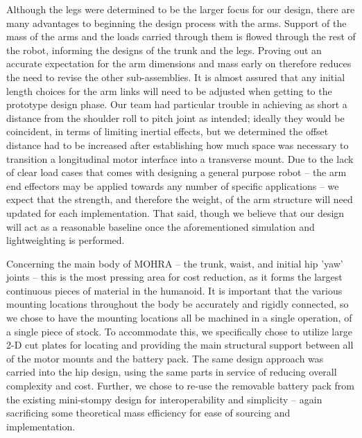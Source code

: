 \documentclass{article}
\begin{document}
Although the legs were determined to be the larger focus for our design, there are many advantages to beginning the design process with the arms. Support of the mass of the arms and the loads carried through them is flowed through the rest of the robot, informing the designs of the trunk and the legs. Proving out an accurate expectation for the arm dimensions and mass early on therefore reduces the need to revise the other sub-assemblies. It is almost assured that any initial length choices for the arm links will need to be adjusted when getting to the prototype design phase. Our team had particular trouble in achieving as short a distance from the shoulder roll to pitch joint as intended; ideally they would be coincident, in terms of limiting inertial effects, but we determined the offset distance had to be increased after establishing how much space was necessary to transition a longitudinal motor interface into a transverse mount. Due to the lack of clear load cases that comes with designing a general purpose robot -- the arm end effectors may be applied towards any number of specific applications -- we  expect that the strength, and therefore the weight, of the arm structure will need updated for each implementation. That said, though we believe that our design will act as a reasonable baseline once the aforementioned simulation and lightweighting is performed.

Concerning the main body of MOHRA -- the trunk, waist, and initial hip 'yaw' joints -- this is the most pressing area for cost reduction, as it forms the largest continuous pieces of material in the humanoid. It is important that the various mounting locations throughout the body be accurately and rigidly connected, so we chose to have the mounting locations all be machined in a single operation, of a single piece of stock. To accommodate this, we specifically chose to utilize large 2-D cut plates for locating and providing the main structural support between all of the motor mounts and the battery pack. The same design approach was carried into the hip design, using the same parts in service of reducing overall complexity and cost. Further, we chose to re-use the removable battery pack from the existing mini-stompy design for interoperability and simplicity -- again sacrificing some theoretical mass efficiency for ease of sourcing and implementation. 
\end{document}
